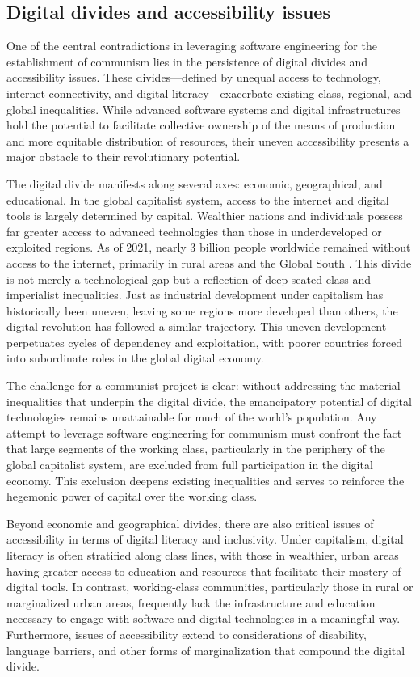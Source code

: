 \begin{refsection}
\subsection{Digital divides and accessibility issues}

One of the central contradictions in leveraging software engineering for the establishment of communism lies in the persistence of digital divides and accessibility issues. These divides—defined by unequal access to technology, internet connectivity, and digital literacy—exacerbate existing class, regional, and global inequalities. While advanced software systems and digital infrastructures hold the potential to facilitate collective ownership of the means of production and more equitable distribution of resources, their uneven accessibility presents a major obstacle to their revolutionary potential.

The digital divide manifests along several axes: economic, geographical, and educational. In the global capitalist system, access to the internet and digital tools is largely determined by capital. Wealthier nations and individuals possess far greater access to advanced technologies than those in underdeveloped or exploited regions. As of 2021, nearly 3 billion people worldwide remained without access to the internet, primarily in rural areas and the Global South \cite[pp.~12]{world_bank_digital_divide}. This divide is not merely a technological gap but a reflection of deep-seated class and imperialist inequalities. Just as industrial development under capitalism has historically been uneven, leaving some regions more developed than others, the digital revolution has followed a similar trajectory. This uneven development perpetuates cycles of dependency and exploitation, with poorer countries forced into subordinate roles in the global digital economy.

The challenge for a communist project is clear: without addressing the material inequalities that underpin the digital divide, the emancipatory potential of digital technologies remains unattainable for much of the world's population. Any attempt to leverage software engineering for communism must confront the fact that large segments of the working class, particularly in the periphery of the global capitalist system, are excluded from full participation in the digital economy. This exclusion deepens existing inequalities and serves to reinforce the hegemonic power of capital over the working class.

Beyond economic and geographical divides, there are also critical issues of accessibility in terms of digital literacy and inclusivity. Under capitalism, digital literacy is often stratified along class lines, with those in wealthier, urban areas having greater access to education and resources that facilitate their mastery of digital tools. In contrast, working-class communities, particularly those in rural or marginalized urban areas, frequently lack the infrastructure and education necessary to engage with software and digital technologies in a meaningful way. Furthermore, issues of accessibility extend to considerations of disability, language barriers, and other forms of marginalization that compound the digital divide.


\end{refsection}
